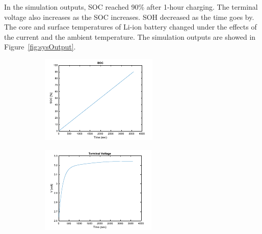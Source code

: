 \documentclass[12pt]{article}
\begin{document}
In the simulation outputs, SOC reached 90\% after 1-hour charging. The terminal voltage also increases as the SOC increases. SOH decreased as the time goes by. The core and surface temperatures of Li-ion battery changed under the effects of the current and the ambient temperature. The simulation outputs are showed in Figure~\ref{fig:sysOutput}.
\begin{figure}[H]
	\centering
	\begin{subfigure}[t]{0.45\linewidth}
		\includegraphics[width=\linewidth]{figures/sysOutput1.pdf}
	\end{subfigure}
	\begin{subfigure}[t]{0.45\linewidth}
		\includegraphics[width=\linewidth]{figures/sysOutput2.pdf}

\end{subfigure}
\end{figure}
\end{document}
